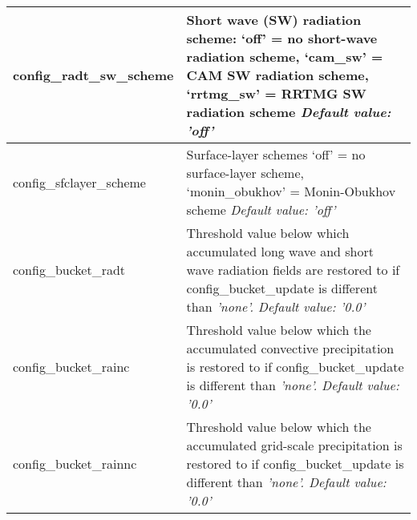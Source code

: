{\begin{longtable}{|p{2.0in} |p{4.25in}|}
  config\_radt\_sw\_scheme & Short wave (SW) radiation scheme: \newline
                                             `off' = no short-wave radiation scheme, \newline
                                             `cam\_sw' = CAM SW radiation scheme, \newline
                                             `rrtmg\_sw' = RRTMG SW radiation scheme \newline                                                                                           
  {\em Default value: 'off'} \\ \hline

  config\_sfclayer\_scheme &  Surface-layer schemes \newline
                                             `off' = no surface-layer scheme, \newline
                                             `monin\_obukhov' = Monin-Obukhov scheme \newline                                              
  {\em Default value: 'off'} \\ \hline
 
  config\_bucket\_radt &  Threshold value below which accumulated long wave and short wave radiation fields are restored to if config\_bucket\_update is different than \em 'none'. \newline
  {\em Default value: '0.0'} \\ \hline
  
  config\_bucket\_rainc &  Threshold value below which the accumulated convective precipitation is restored to if config\_bucket\_update is different than \em 'none'.\newline
  {\em Default value: '0.0'} \\ \hline
  
  config\_bucket\_rainnc &  Threshold value below which the accumulated grid-scale precipitation is restored to if config\_bucket\_update is different than \em 'none'. \newline
  {\em Default value: '0.0'} \\ \hline
  
\end{longtable}
}

